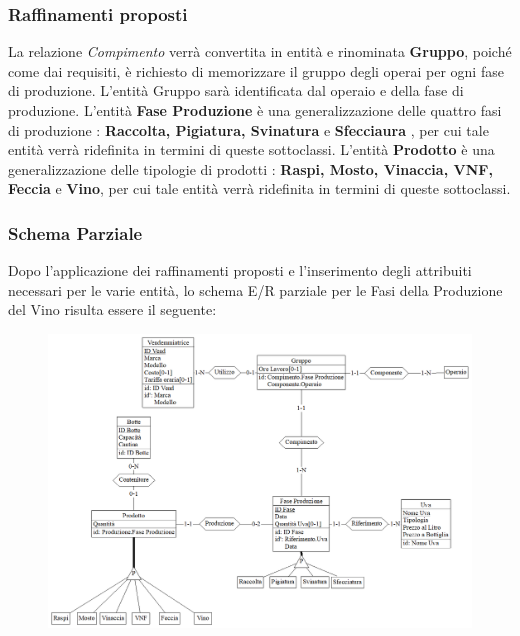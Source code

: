\documentclass{article}
\begin{document}
\subsubsection{Raffinamenti proposti}
La relazione \textit{Compimento} verrà convertita in entità e rinominata \textbf{Gruppo}, poiché come dai requisiti, è richiesto di memorizzare il gruppo degli operai per ogni fase di produzione.
L'entità Gruppo sarà identificata dal operaio e della fase di produzione.
\newline
\newline
L'entità \textbf{Fase Produzione} è una generalizzazione delle quattro fasi di produzione : \textbf{Raccolta, Pigiatura, Svinatura } e \textbf{Sfecciaura }, per cui tale entità verrà ridefinita in termini di queste sottoclassi.
\newline
\newline
L'entità \textbf{Prodotto} è una generalizzazione delle tipologie di prodotti : \textbf{Raspi, Mosto, Vinaccia, VNF, Feccia} e \textbf{Vino}, per cui tale entità verrà ridefinita in termini di queste sottoclassi.
\newpage 
\subsubsection{Schema Parziale}
Dopo l'applicazione dei raffinamenti proposti e l'inserimento degli attribuiti necessari per le varie entità, lo schema E/R parziale per le Fasi della Produzione del Vino risulta essere il seguente:
\begin{figure}[htbp]
\centering
\includegraphics[width=1\textwidth]{img/Fasi_Parziale}
\end{figure}

\newpage
\end{document}
